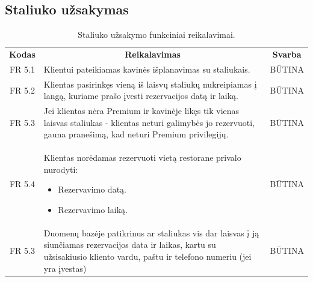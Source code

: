 \documentclass{VUMIFPSkursinis}
\begin{document}
\pagebreak


\subsection{Staliuko užsakymas}
\begin{center}
	\begin{table}[H]
	\caption{Staliuko užsakymo funkciniai reikalavimai.}
	\begin{tabular}{|p{2cm}|p{}|p{}|}
	
	\hline
	    \rowcolor{lightgray}
		\multicolumn{3}{|c|}{Staliuko užsakymas}\\
		
	\hline
		\multicolumn{1}{|c|}{{\bfseries Kodas}}&
		\multicolumn{1}{|c|}{{\bfseries Reikalavimas}}&
		\multicolumn{1}{|c|}{{\bfseries Svarba}}\\

	\hline
	
		\multicolumn{1}{|c|}{FR 5.1}&
		{Klientui pateikiamas kavinės išplanavimas su staliukais.}&
		\multicolumn{1}{|c|}{BŪTINA}\\				
	\hline
	
		\multicolumn{1}{|c|}{FR 5.2}&
		{Klientas pasirinkęs vieną iš laisvų staliukų nukreipiamas į langą, kuriame prašo įvesti rezervacijos datą ir laiką.}&
		\multicolumn{1}{|c|}{BŪTINA}\\				
	\hline
	
		\multicolumn{1}{|c|}{FR 5.3}&
		{Jei klientas nėra Premium ir kavinėje likęs tik vienas laisvas staliukas - klientas neturi galimybės jo rezervuoti, gauna pranešimą, kad neturi Premium privilegijų.}&
		\multicolumn{1}{|c|}{BŪTINA}\\				
	\hline
	
		\multicolumn{1}{|c|}{FR 5.4}&
		{Klientas norėdamas rezervuoti vietą restorane privalo nurodyti:
			\begin{itemize}
				\item Rezervavimo datą.
				\item Rezervavimo laiką.
			\end{itemize}}&
			\multicolumn{1}{|c|}{BŪTINA}\\				
	\hline
	
		\multicolumn{1}{|c|}{FR 5.3}&
		{Duomenų bazėje patikrinus ar staliukas vis dar laisvas į ją siunčiamas rezervacijos data ir laikas, kartu su užsisakiusio kliento vardu, paštu ir telefono numeriu (jei yra įvestas)}&
		\multicolumn{1}{|c|}{BŪTINA}\\				
	\hline
	
			
	
	\end{tabular}		
	
	\label{table:StaliukoUžsakymas}
	\end{table}


\end{center}
\end{document}
